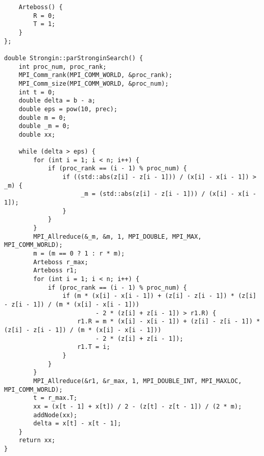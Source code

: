 \documentclass{report}
\begin{document}
\begin{lstlisting}
    Arteboss() {
        R = 0;
        T = 1;
    }
};

double Strongin::parStronginSearch() {
    int proc_num, proc_rank;
    MPI_Comm_rank(MPI_COMM_WORLD, &proc_rank);
    MPI_Comm_size(MPI_COMM_WORLD, &proc_num);
    int t = 0;
    double delta = b - a;
    double eps = pow(10, prec);
    double m = 0;
    double _m = 0;
    double xx;

    while (delta > eps) {
        for (int i = 1; i < n; i++) {
            if (proc_rank == (i - 1) % proc_num) {
                if ((std::abs(z[i] - z[i - 1])) / (x[i] - x[i - 1]) > _m) {
                     _m = (std::abs(z[i] - z[i - 1])) / (x[i] - x[i - 1]);
                }
            }
        }
        MPI_Allreduce(&_m, &m, 1, MPI_DOUBLE, MPI_MAX, MPI_COMM_WORLD);
        m = (m == 0 ? 1 : r * m);
        Arteboss r_max;
        Arteboss r1;
        for (int i = 1; i < n; i++) {
            if (proc_rank == (i - 1) % proc_num) {
                if (m * (x[i] - x[i - 1]) + (z[i] - z[i - 1]) * (z[i] - z[i - 1]) / (m * (x[i] - x[i - 1]))
                         - 2 * (z[i] + z[i - 1]) > r1.R) {
                    r1.R = m * (x[i] - x[i - 1]) + (z[i] - z[i - 1]) * (z[i] - z[i - 1]) / (m * (x[i] - x[i - 1]))
                         - 2 * (z[i] + z[i - 1]);
                    r1.T = i;
                }
            }
        }
        MPI_Allreduce(&r1, &r_max, 1, MPI_DOUBLE_INT, MPI_MAXLOC, MPI_COMM_WORLD);
        t = r_max.T;
        xx = (x[t - 1] + x[t]) / 2 - (z[t] - z[t - 1]) / (2 * m);
        addNode(xx);
        delta = x[t] - x[t - 1];
    }
    return xx;
}

\end{lstlisting}
\end{document}
